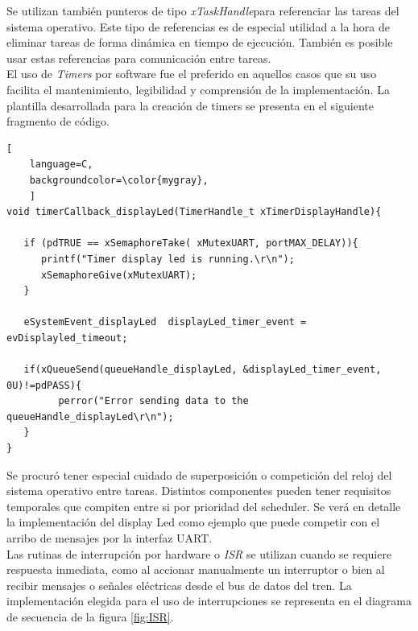 Se utilizan también punteros de tipo \textit{xTaskHandle}para referenciar las tareas del sistema operativo. Este tipo de referencias es de especial utilidad a la hora de eliminar tareas de forma dinámica en tiempo de ejecución. También es posible usar estas referencias para comunicación entre tareas.\\

El uso de \textit{Timers} por software fue el preferido en aquellos casos que su uso facilita el mantenimiento, legibilidad y comprensión de la implementación. La plantilla desarrollada para la creación de timers se presenta en el siguiente fragmento de código.

\begin{lstlisting}[
	language=C, 
	backgroundcolor=\color{mygray},
	]
void timerCallback_displayLed(TimerHandle_t xTimerDisplayHandle){

   if (pdTRUE == xSemaphoreTake( xMutexUART, portMAX_DELAY)){
      printf("Timer display led is running.\r\n");
      xSemaphoreGive(xMutexUART);
   }

   eSystemEvent_displayLed  displayLed_timer_event = evDisplayled_timeout;
   
   if(xQueueSend(queueHandle_displayLed, &displayLed_timer_event, 0U)!=pdPASS){
         perror("Error sending data to the queueHandle_displayLed\r\n");
   }
}

\end{lstlisting}

Se procuró tener especial cuidado de superposición o competición del reloj del sistema operativo entre tareas. Distintos componentes pueden tener requisitos temporales que compiten entre si por prioridad del scheduler. Se verá en detalle la implementación del display Led como ejemplo que puede competir con el arribo de mensajes por la interfaz UART.\\

Las rutinas de interrupción por hardware o \textit{ISR} se utilizan cuando se requiere respuesta inmediata, como al accionar manualmente un interruptor o bien al recibir mensajes o señales eléctricas desde el bus de datos del tren. La implementación elegida para el uso de interrupciones se representa en el diagrama de secuencia de la figura \ref{fig:ISR}. \\

